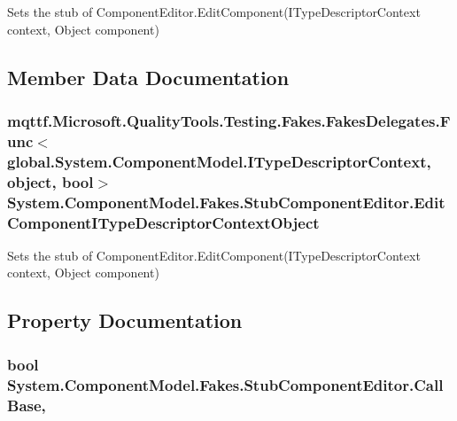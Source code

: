 Sets the stub of Component\-Editor.\-Edit\-Component(\-I\-Type\-Descriptor\-Context context, Object component)



\subsection{Member Data Documentation}
\hypertarget{class_system_1_1_component_model_1_1_fakes_1_1_stub_component_editor_a1169bf893adb3fefb5bcc3bc9ca9a37c}{
\subsubsection[{Edit\-Component\-I\-Type\-Descriptor\-Context\-Object}]{\setlength{\rightskip}{0pt plus 5cm}mqttf.\-Microsoft.\-Quality\-Tools.\-Testing.\-Fakes.\-Fakes\-Delegates.\-Func$<$global.\-System.\-Component\-Model.\-I\-Type\-Descriptor\-Context, object, bool$>$ System.\-Component\-Model.\-Fakes.\-Stub\-Component\-Editor.\-Edit\-Component\-I\-Type\-Descriptor\-Context\-Object}}\label{class_system_1_1_component_model_1_1_fakes_1_1_stub_component_editor_a1169bf893adb3fefb5bcc3bc9ca9a37c}


Sets the stub of Component\-Editor.\-Edit\-Component(\-I\-Type\-Descriptor\-Context context, Object component)



\subsection{Property Documentation}
\hypertarget{class_system_1_1_component_model_1_1_fakes_1_1_stub_component_editor_ad6bf02c28d20740cab9cb556ea4991ed}{
\subsubsection[{Call\-Base}]{\setlength{\rightskip}{0pt plus 5cm}bool System.\-Component\-Model.\-Fakes.\-Stub\-Component\-Editor.\-Call\-Base\hspace{0.3cm}{\ttfamily [get]}, {\ttfamily [set]}}}\label{class_system_1_1_component_model_1_1_fakes_1_1_stub_component_editor_ad6bf02c28d20740cab9cb556ea4991ed}


